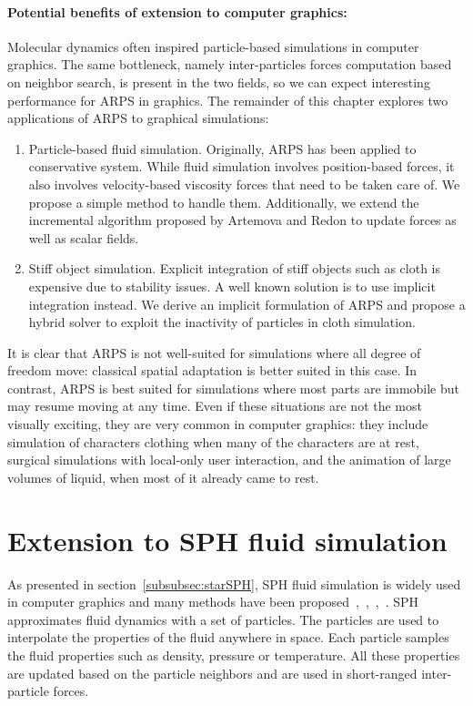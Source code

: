 \paragraph*{Potential benefits of extension to computer graphics:}
Molecular dynamics often inspired particle-based simulations in computer graphics. The same bottleneck, namely inter-particles forces computation based on neighbor search, is present in the two fields, so we can expect interesting performance for ARPS in graphics. The remainder of this chapter explores two applications of ARPS to graphical simulations:
\begin{enumerate}
\item Particle-based fluid simulation. Originally, ARPS has been applied to conservative system. While fluid simulation involves position-based forces, it also involves velocity-based viscosity forces that need to be taken care of. We propose a simple method to handle them. Additionally, we extend the incremental algorithm proposed by Artemova and Redon to update forces as well as scalar fields.
\item Stiff object simulation. Explicit integration of stiff objects such as cloth is expensive due to stability issues. A well known solution is to use implicit integration instead. We derive an implicit formulation of ARPS and propose a hybrid solver to exploit the inactivity of particles in cloth simulation.
\end{enumerate}
It is clear that ARPS is not well-suited for simulations where all degree of freedom move: classical spatial adaptation is better suited in this case. In contrast, ARPS is best suited for simulations where most parts are immobile but may resume moving at any time. Even if these situations are not the most visually exciting, they are very common in computer graphics: they include simulation of characters clothing when many of the characters are at rest, surgical simulations with local-only user interaction, and the animation of large volumes of liquid, when most of it already came to rest.

\section{ Extension to SPH fluid simulation } 
\label{sec:arps_sph}
As presented in section~\ref{subsubsec:starSPH}, SPH fluid simulation is widely used in computer graphics and many methods have been proposed~\cite{Desbrun1996},~\cite{Muller2003},~\cite{Solenthaler2009},~\cite{Ihmsen2014:IISPH}.
SPH approximates fluid dynamics with a set of particles.
The particles are used to interpolate the properties of the fluid anywhere in space.
Each particle samples the fluid properties such as density, pressure or temperature. All these properties are updated based on the particle neighbors and are
used in short-ranged inter-particle forces.
